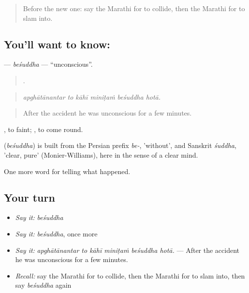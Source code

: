 \label{lesson:MR-C296-besuddha}



\begin{quote}
Before the new one: say the Marathi for to collide, then the Marathi for to slam into.
\end{quote}

\subsection*{You'll want to know: }
\textbf{} — \emph{beśuddha} — \textquotedblleft{}unconscious\textquotedblright{}.

\begin{quote}
     .
\end{quote}

\begin{quote}
\emph{apghātānantar to kāhī miniṭaṁ beśuddha hotā.}
\end{quote}

\begin{quote}
After the accident he was unconscious for a few minutes.
\end{quote}

 , to faint;  , to come round.

\begin{cousinweb}
\textbf{} (\emph{beśuddha}) is built from the Persian prefix \emph{be-}, 'without', and Sanskrit \emph{śuddha}, 'clear, pure' (Monier-Williams), here in the sense of a clear mind.
\end{cousinweb}

\begin{grammarlens}[title={What you've built}]
One more word for telling what happened.
\end{grammarlens}

\subsection*{Your turn}
\begin{itemize}
\raggedright
  \item \emph{Say it:} \emph{beśuddha}
  \item \emph{Say it:} \emph{beśuddha}, once more
  \item \emph{Say it:} \emph{apghātānantar to kāhī miniṭaṁ beśuddha hotā.} — After the accident he was unconscious for a few minutes.
  \item \emph{Recall:} say the Marathi for to collide, then the Marathi for to slam into, then say \emph{beśuddha} again
\end{itemize}

